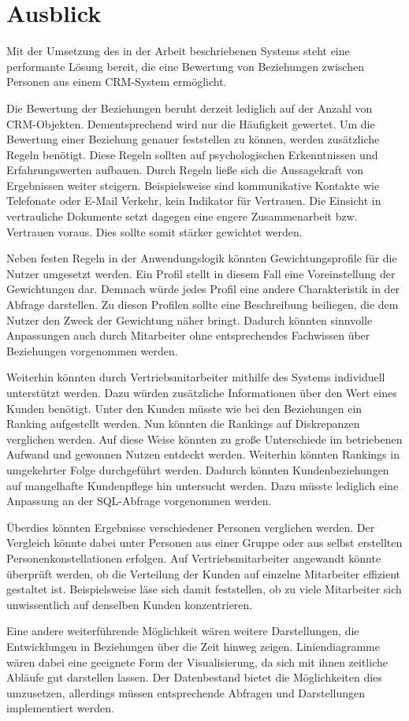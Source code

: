 \section{Ausblick}
\label{ch:Ergebnis:sec:Ausblick}

Mit der Umsetzung des in der Arbeit beschriebenen Systems steht eine performante Lösung bereit, die eine Bewertung von Beziehungen zwischen Personen aus einem CRM-System ermöglicht.

Die Bewertung der Beziehungen beruht derzeit lediglich auf der Anzahl von CRM-Objekten. Dementsprechend wird nur die Häufigkeit gewertet. Um die Bewertung einer Beziehung genauer feststellen zu können, werden zusätzliche Regeln benötigt. Diese Regeln sollten auf psychologischen Erkenntnissen und Erfahrungswerten aufbauen. Durch Regeln ließe sich die Aussagekraft von Ergebnissen weiter steigern. Beispielsweise sind kommunikative Kontakte wie Telefonate oder E-Mail Verkehr, kein Indikator für Vertrauen. Die Einsicht in vertrauliche Dokumente setzt dagegen eine engere Zusammenarbeit bzw. Vertrauen voraus. Dies sollte somit stärker gewichtet werden. 

Neben festen Regeln in der Anwendungslogik könnten Gewichtungsprofile für die Nutzer umgesetzt werden. Ein Profil stellt in diesem Fall eine Voreinstellung der Gewichtungen dar. Demnach würde jedes Profil eine andere Charakteristik in der Abfrage darstellen. Zu diesen Profilen sollte eine Beschreibung beiliegen, die dem Nutzer den Zweck der Gewichtung näher bringt. Dadurch könnten sinnvolle Anpassungen auch durch Mitarbeiter ohne entsprechendes Fachwissen über Beziehungen vorgenommen werden.

Weiterhin könnten durch Vertriebsmitarbeiter mithilfe des Systems individuell unterstützt werden. Dazu würden zusätzliche Informationen über den Wert eines Kunden benötigt. Unter den Kunden müsste wie bei den Beziehungen ein Ranking aufgestellt werden. Nun könnten die Rankings auf Diskrepanzen verglichen werden. Auf diese Weise könnten zu große Unterschiede im betriebenen Aufwand und gewonnen Nutzen entdeckt werden. Weiterhin könnten Rankings in umgekehrter Folge durchgeführt werden. Dadurch könnten Kundenbeziehungen auf mangelhafte Kundenpflege hin untersucht werden. Dazu müsste lediglich eine Anpassung an der SQL-Abfrage vorgenommen werden.

Überdies könnten Ergebnisse verschiedener Personen verglichen werden. Der Vergleich könnte dabei unter Personen aus einer Gruppe oder aus selbst erstellten Personenkonstellationen erfolgen. Auf Vertriebsmitarbeiter angewandt könnte überprüft werden, ob die Verteilung der Kunden auf einzelne Mitarbeiter effizient gestaltet ist. Beispielsweise läse sich damit feststellen, ob zu viele Mitarbeiter sich unwissentlich auf denselben Kunden konzentrieren.

Eine andere weiterführende Möglichkeit wären weitere Darstellungen, die Entwicklungen in Beziehungen über die Zeit hinweg  zeigen. Liniendiagramme wären dabei eine geeignete Form der Visualisierung, da sich mit ihnen zeitliche Abläufe gut darstellen lassen. Der Datenbestand bietet die Möglichkeiten dies umzusetzen, allerdings müssen entsprechende Abfragen und Darstellungen implementiert werden.  

